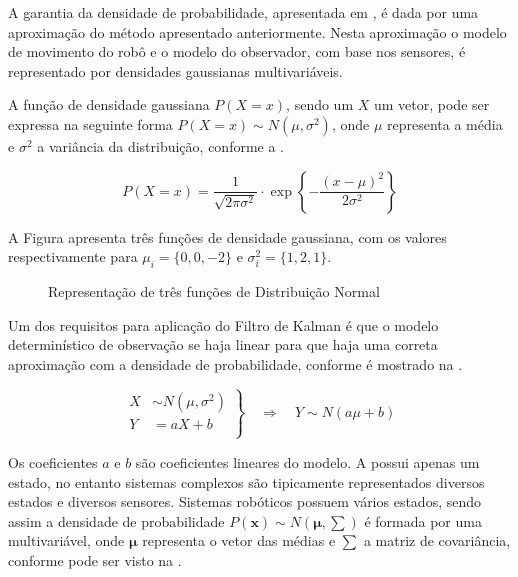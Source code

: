 A garantia da densidade de probabilidade, apresentada em , é dada por uma aproximação do método apresentado anteriormente. Nesta aproximação o modelo de movimento do robô e o modelo do observador, com base nos sensores, é representado por densidades gaussianas multivariáveis.

A função de densidade gaussiana $P(X = x)$, sendo um $X$ um vetor, pode ser expressa na seguinte forma ${P(X = x) \sim N(\mu, \sigma^2)}$, onde $\mu$ representa a média e $\sigma^2$ a variância da distribuição, conforme a  .

\begin{equation}
    \label{eq:gauss1}
    P(X = x) = \dfrac{1}{\sqrt{2\pi\sigma^2}}\cdot 
    \exp\left\{-\frac{(x-\mu)^2}{2\sigma^2}\right\}
\end{equation}

A Figura  apresenta três funções de densidade gaussiana, com os valores respectivamente para $\mu_i = \{0,0,-2\}$ e $\sigma^2_i = \{1,2,1\}$.


\begin{figure}[!ht]
    \centering
    
    \caption{Representação de três funções de Distribuição Normal}
    \label{fig::gauss1}
\end{figure}

Um dos requisitos para aplicação do Filtro de Kalman é que o modelo determinístico de observação se haja linear para que haja uma correta aproximação com a densidade de probabilidade, conforme é mostrado na  .


\begin{equation}
    \label{eq::linear1d}
    \left.
    \begin{aligned}
            X & \sim N\left(\mu, \sigma^2\right)\\
            Y & = aX + b\\
    \end{aligned} \right\}
    \quad \Rightarrow \quad Y \sim N\left(a\mu+b\right)
\end{equation}

Os coeficientes $a$ e $b$ são coeficientes lineares do modelo. A  possui apenas um estado, no entanto sistemas complexos são tipicamente representados diversos estados e diversos sensores.
Sistemas robóticos possuem vários estados, sendo assim a densidade de probabilidade ${P(\mathbf{x}) \sim N(\boldsymbol{\mu}, \textstyle\sum)}$ é formada por uma  multivariável, onde $\boldsymbol{\mu}$ representa o vetor das médias e ${\textstyle\sum}$ a matriz de covariância, conforme pode ser visto na  .


